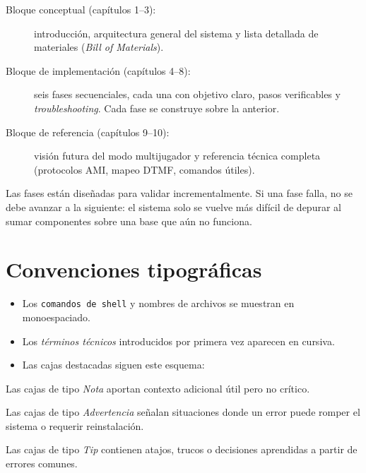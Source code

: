 \begin{description}
  \item[Bloque conceptual (capítulos 1--3):] introducción, arquitectura general del sistema y lista detallada de materiales (\emph{Bill of Materials}).
  \item[Bloque de implementación (capítulos 4--8):] seis fases secuenciales, cada una con objetivo claro, pasos verificables y \emph{troubleshooting}. Cada fase se construye sobre la anterior.
  \item[Bloque de referencia (capítulos 9--10):] visión futura del modo multijugador y referencia técnica completa (protocolos AMI, mapeo DTMF, comandos útiles).
\end{description}

\begin{nota}
Las fases están diseñadas para validar incrementalmente. Si una fase falla, no se debe avanzar a la siguiente: el sistema solo se vuelve más difícil de depurar al sumar componentes sobre una base que aún no funciona.
\end{nota}

\section{Convenciones tipográficas}

\begin{itemize}
  \item Los \texttt{comandos de shell} y nombres de archivos se muestran en monoespaciado.
  \item Los \emph{términos técnicos} introducidos por primera vez aparecen en cursiva.
  \item Las cajas destacadas siguen este esquema:
\end{itemize}

\begin{nota}
Las cajas de tipo \emph{Nota} aportan contexto adicional útil pero no crítico.
\end{nota}

\begin{advertencia}
Las cajas de tipo \emph{Advertencia} señalan situaciones donde un error puede romper el sistema o requerir reinstalación.
\end{advertencia}

\begin{tip}
Las cajas de tipo \emph{Tip} contienen atajos, trucos o decisiones aprendidas a partir de errores comunes.
\end{tip}
